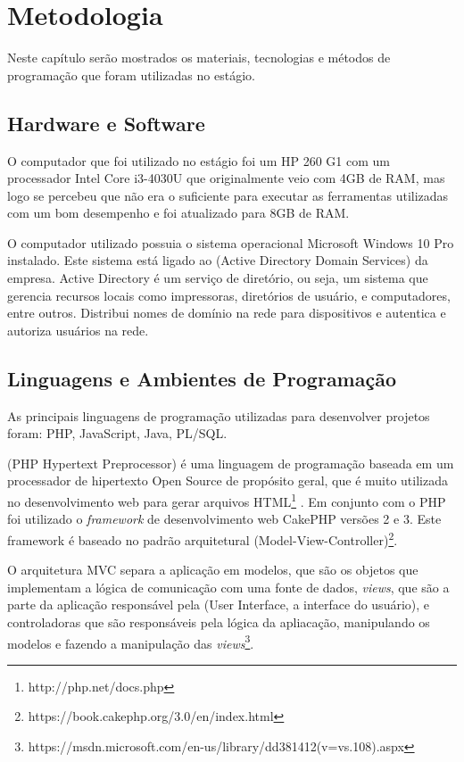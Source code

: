 \chapter{Metodologia} \label{cap:metod}

Neste capítulo serão mostrados os materiais, tecnologias e métodos de programação que foram utilizadas no estágio. 

\section{Hardware e Software}

O computador que foi utilizado no estágio foi um HP 260 G1 com um processador Intel Core i3-4030U que originalmente veio com 4GB de RAM, mas logo se percebeu que não era o suficiente para executar as ferramentas utilizadas com um bom desempenho e foi atualizado para 8GB de RAM.

O computador utilizado possuia o sistema operacional Microsoft Windows 10 Pro instalado. Este sistema está ligado ao  (Active Directory Domain Services) da empresa. Active Directory é um serviço de diretório, ou seja, um sistema que gerencia recursos locais como impressoras, diretórios de usuário, e computadores, entre outros. Distribui nomes de domínio na rede para dispositivos e autentica e autoriza usuários na rede.

\section{Linguagens e Ambientes de Programação}

As principais linguagens de programação utilizadas para desenvolver projetos foram: PHP, JavaScript, Java, PL/SQL.

 (PHP Hypertext Preprocessor) é uma linguagem de programação baseada em um  processador de hipertexto Open Source de propósito geral, que é muito utilizada no  desenvolvimento web para gerar arquivos HTML\footnote{http://php.net/docs.php} . Em conjunto com o PHP foi utilizado o \textit{framework} de desenvolvimento web CakePHP versões 2 e 3. Este framework é baseado no padrão arquitetural  (Model-View-Controller)\footnote{https://book.cakephp.org/3.0/en/index.html}.

O arquitetura MVC separa a aplicação em modelos, que são os objetos que implementam a lógica de comunicação com uma fonte de dados, \textit{views}, que são a parte da aplicação responsável pela  (User Interface, a interface do usuário), e controladoras que são responsáveis pela lógica da apliacação, manipulando os modelos e fazendo a manipulação das \textit{views}\footnote{https://msdn.microsoft.com/en-us/library/dd381412(v=vs.108).aspx}.

